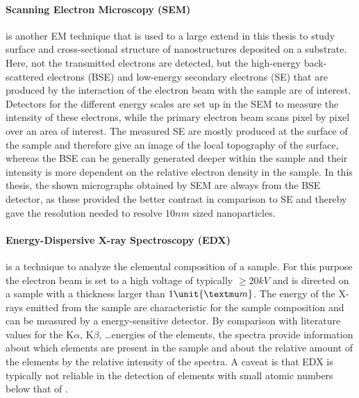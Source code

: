 \documentclass[\main/dresen_thesis.tex]{subfiles}
\begin{document}
    \paragraph{Scanning Electron Microscopy (SEM)}
      is another EM technique that is used to a large extend in this thesis to study surface and cross-sectional structure of nanostructures deposited on a substrate.
      Here, not the transmitted electrons are detected, but the high-energy back-scattered electrons (BSE) and low-energy secondary electrons (SE) that are produced by the interaction of the electron beam with the sample are of interest.
      Detectors for the different energy scales are set up in the SEM to measure the intensity of these electrons, while the primary electron beam scans pixel by pixel over an area of interest.
      The measured SE are mostly produced at the surface of the sample and therefore give an image of the local topography of the surface, whereas the BSE can be generally generated deeper within the sample and their intensity is more dependent on the relative electron density in the sample.
      In this thesis, the shown micrographs obtained by SEM are always from the BSE detector, as these provided the better contrast in comparison to SE and thereby gave the resolution needed to resolve $10 \unit{nm}$ sized nanoparticles.

    \paragraph{Energy-Dispersive X-ray Spectroscopy (EDX)}
      is a technique to analyze the elemental composition of a sample.
      For this purpose the electron beam is set to a high voltage of typically $\geq 20 \unit{kV}$ and is directed on a sample with a thickness larger than $1 \unit{\textmu m}$.
      The energy of the X-rays emitted from the sample are characteristic for the sample composition and can be measured by a energy-sensitive detector.
      By comparison with literature values for the K$\alpha$, K$\beta$, \ldots energies of the elements, the spectra provide information about which elements are present in the sample and about the relative amount of the elements by the relative intensity of the spectra.
      A caveat is that EDX is typically not reliable in the detection of elements with small atomic numbers below that of .
\end{document}
